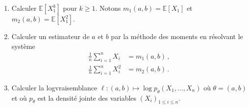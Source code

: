 \documentclass[a4paper,10pt,fleqn]{article}
\newcommand{\1}{\ensuremath{\mathbbm{1}}}
\begin{document}
\begin{enumerate}
\item Calculer $\mathbb{E}[X_1^k]$ pour $k\geq 1$. Notons $m_1(a,b) = \mathbb{E}[X_1]$ et $m_2(a,b) = \mathbb{E}[X^2_1]$.
%
%

 \item Calculer un estimateur de $a$ et $b$ par la m\'ethode des moments en r\'esolvant le syst\`eme
\begin{align*}
\frac{1}{n}\sum_{i=1}^nX_i &= m_1(a,b) \,,\\
\frac{1}{n}\sum_{i=1}^nX^2_i &= m_2(a,b) \,.
\end{align*}

%

\item Calculer la logvraisemblance $\ell : (a,b) \mapsto \log p_\theta (X_1,\ldots,X_n)$ o\`u $\theta = (a,b)$ et o\`u $p_\theta$ est la densit\'e jointe des variables $(X_i)_{1\leq i \leq n}$.

%


\end{enumerate}
\end{document}
